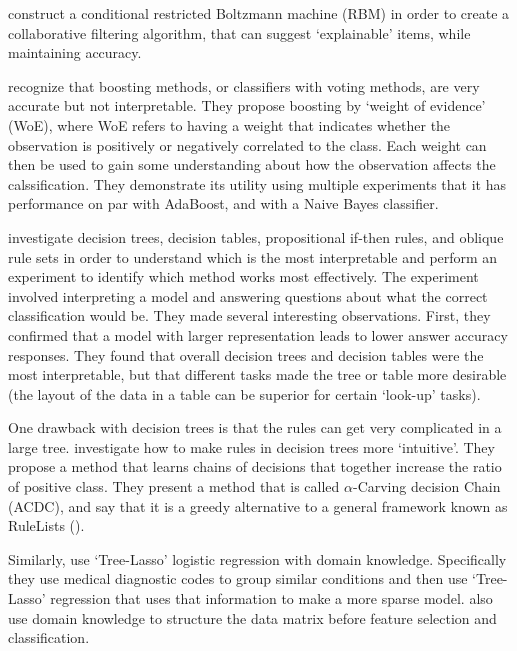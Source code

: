     \citet{Abdollahi2016-vn} construct a conditional restricted Boltzmann machine (RBM) in order to create a collaborative filtering algorithm, that can suggest `explainable' items, while maintaining accuracy. 

    \citet{Ridgeway1998-lv} recognize that boosting methods, or classifiers with voting methods, are very accurate but not interpretable. They propose boosting by `weight of evidence' (WoE), where WoE refers to having a weight that indicates whether the observation is positively or negatively correlated to the class. Each weight can then be used to gain some understanding about how the observation affects the calssification. They demonstrate its utility using multiple experiments that it has performance on par with AdaBoost, and with a Naive Bayes classifier. 

    \citet{Huysmans2011-th} investigate decision trees, decision tables, propositional if-then rules, and oblique rule sets in order to understand which is the most interpretable and perform an experiment to identify which method works most effectively. The experiment involved interpreting a model and answering questions about what the correct classification would be. They made several interesting observations. First, they confirmed that a model with larger representation leads to lower answer accuracy responses. They found that overall decision trees and decision tables were the most interpretable, but that different tasks made the tree or table more desirable (the layout of the data in a table can be superior for certain `look-up' tasks).

    One drawback with decision trees is that the rules can get very complicated in a large tree. \citet{Park2016-ld} investigate how to make rules in decision trees more `intuitive'. They propose a method that learns chains of decisions that together increase the ratio of positive class. They present a method that is called $\alpha$-Carving decision Chain (ACDC), and say that it is a greedy alternative to a general framework known as RuleLists (\citet{Wang2015-ww}). 


    Similarly, \citet{Jovanovic2016-gw} use `Tree-Lasso' logistic regression with domain knowledge. Specifically they use medical diagnostic codes to group similar conditions and then use `Tree-Lasso' regression that uses that information to make a more sparse model. \citet{Zycinski2012-jj} also use domain knowledge to structure the data matrix before feature selection and classification. 


